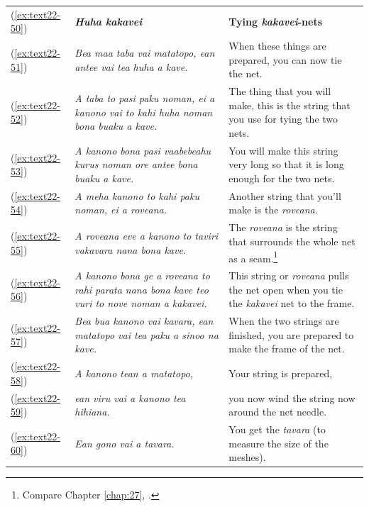 \documentclass[output=paper]{langscibook}
\begin{document}
\begin{xltabular}{\textwidth}{lXX}
	(\ref{ex:text22-50})&\textbf{\textit{Huha kakavei}}&\textbf{Tying \textit{kakavei}-nets}\\
	(\ref{ex:text22-51})&\textit{Bea maa taba vai matatopo, ean antee vai tea huha a kave.}&When these things are prepared, you can now tie the net.\\
	(\ref{ex:text22-52})&\textit{A taba to pasi paku noman, ei a kanono vai to kahi huha noman bona buaku a kave.}&The thing that you will make, this is the string that you use for tying the two nets.\\
	(\ref{ex:text22-53})&\textit{A kanono bona pasi vaabebeahu kurus noman ore antee bona buaku a kave.}&You will make this string very long so that it is long enough for the two nets.\\
	(\ref{ex:text22-54})&\textit{A meha kanono to kahi paku noman, ei a roveana.}&Another string that you'll make is the \textit{roveana}.\\
	(\ref{ex:text22-55})&\textit{A roveana eve a kanono to taviri vakavara nana bona kave.}&The \textit{roveana} is the string that surrounds the whole net as a seam.\footnote{Compare Chapter \ref{chap:27}, .}\\
	(\ref{ex:text22-56})&\textit{A kanono bona ge a roveana to rahi parata nana bona kave teo vuri to nove noman a kakavei.}&This string or \textit{roveana} pulls the net open when you tie the \textit{kakavei} net to the frame.\\
	(\ref{ex:text22-57})&\textit{Bea bua kanono vai kavara, ean matatopo vai tea paku a sinoo na kave.}&When the two strings are finished, you are prepared to make the frame of the net.\\
	(\ref{ex:text22-58})&\textit{A kanono tean a matatopo,}&Your string is prepared,\\
	(\ref{ex:text22-59})&\textit{ean viru vai a kanono tea hihiana.}&you  now wind the string now around the net needle.\\
	(\ref{ex:text22-60})&\textit{Ean gono vai a tavara.}&You get the \textit{tavara} (to measure the size of the meshes).\\
\end{xltabular}
\end{document}
